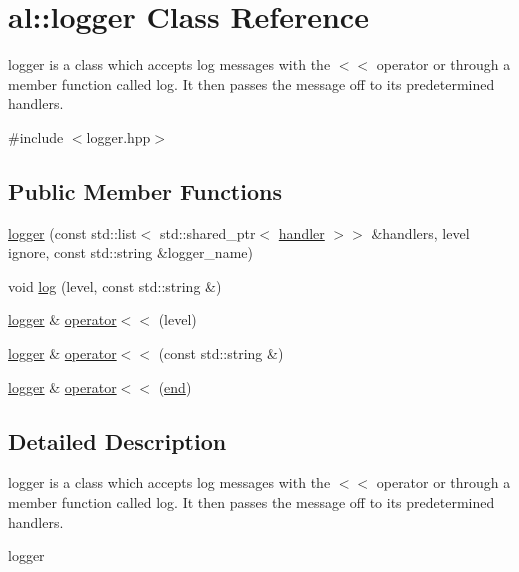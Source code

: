 \hypertarget{classal_1_1logger}{\section{al\-:\-:logger \-Class \-Reference}
\label{classal_1_1logger}
}


logger is a class which accepts log messages with the $<$$<$ operator or through a member function called log. \-It then passes the message off to its predetermined handlers.  




{\ttfamily \#include $<$logger.\-hpp$>$}

\subsection*{\-Public \-Member \-Functions}
\begin{DoxyCompactItemize}
\item 
\hyperlink{classal_1_1logger_a1b4657f03e90502d6cc655051d968a64}{logger} (const std\-::list$<$ std\-::shared\-\_\-ptr$<$ \hyperlink{classal_1_1handler}{handler} $>$$>$ \&handlers, level ignore, const std\-::string \&logger\-\_\-name)
\item 
void \hyperlink{classal_1_1logger_a4b0997a0f58aa36f7bb3e18826f3bf19}{log} (level, const std\-::string \&)
\item 
\hyperlink{classal_1_1logger}{logger} \& \hyperlink{classal_1_1logger_aa95776ee6cf9af0a50ad12da5670f28f}{operator$<$$<$} (level)
\item 
\hyperlink{classal_1_1logger}{logger} \& \hyperlink{classal_1_1logger_a3b5dfbc33c27b16367d6154c99f751b2}{operator$<$$<$} (const std\-::string \&)
\item 
\hyperlink{classal_1_1logger}{logger} \& \hyperlink{classal_1_1logger_add696d93a24662bc71658703e52e134f}{operator$<$$<$} (\hyperlink{classal_1_1end}{end})
\end{DoxyCompactItemize}


\subsection{\-Detailed \-Description}
logger is a class which accepts log messages with the $<$$<$ operator or through a member function called log. \-It then passes the message off to its predetermined handlers. 

logger 

